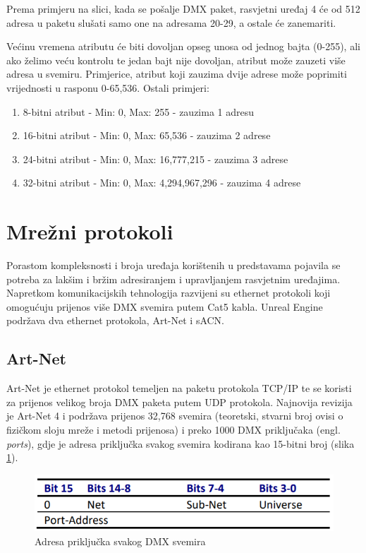\documentclass[times, utf8, zavrsni, numeric]{fer}
\begin{document}
Prema primjeru na slici, kada se pošalje DMX paket, rasvjetni uređaj 4 će od 512 adresa u paketu slušati samo one na adresama 20-29, a ostale će zanemariti. \newline

Većinu vremena atributu će biti dovoljan opseg unosa od jednog bajta (0-255), ali ako želimo veću kontrolu te jedan bajt nije dovoljan, atribut može zauzeti više adresa u svemiru. Primjerice, atribut koji zauzima dvije adrese može poprimiti vrijednosti u rasponu 0-65,536. Ostali primjeri:

\begin{enumerate}
	\item 8-bitni atribut - Min: 0, Max: 255 - zauzima 1 adresu
	\item 16-bitni atribut - Min: 0, Max: 65,536 - zauzima 2 adrese
	\item 24-bitni atribut - Min: 0, Max: 16,777,215  - zauzima 3 adrese
	\item 32-bitni atribut - Min: 0, Max: 4,294,967,296  - zauzima 4 adrese
\end{enumerate}

\section{Mrežni protokoli}
Porastom kompleksnosti i broja uređaja korištenih u predstavama pojavila se potreba za lakšim i bržim adresiranjem i upravljanjem rasvjetnim uređajima. Napretkom komunikacijskih tehnologija razvijeni su ethernet protokoli koji omogućuju prijenos više DMX svemira putem Cat5 kabla. Unreal Engine podržava dva ethernet protokola, Art-Net i sACN.

\subsection{Art-Net}
Art-Net je ethernet protokol temeljen na paketu protokola TCP/IP te se koristi za prijenos velikog broja DMX paketa putem UDP protokola. Najnovija revizija je Art-Net 4 i podržava prijenos 32,768 svemira (teoretski, stvarni broj ovisi o fizičkom sloju mreže i metodi prijenosa) i preko 1000 DMX priključaka (engl. \emph{ports}), gdje je adresa priključka svakog svemira kodirana kao 15-bitni broj (slika \ref{fig:slika 3-3}).

\begin{figure}[htp]
	\centering
	\includegraphics[width=\linewidth]{slika 3-3.png}
	\caption{Adresa priključka svakog DMX svemira \cite{art-net}}
	\label{fig:slika 3-3}
\end{figure}
\end{document}
